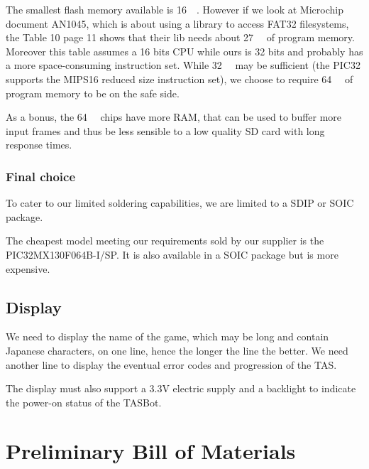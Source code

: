 \documentclass[a4paper,oneside,12pt]{article}
\begin{document}
The smallest flash memory available is \SI{16}{\kibi\byte}. However if we look
at Microchip document AN1045, which is about using a library to access FAT32
filesystems, the Table 10 page 11 shows that their lib needs about
\SI{27}{\kibi\byte} of program memory. Moreover this table assumes a 16 bits CPU
while ours is 32 bits and probably has a more space-consuming instruction
set. While \SI{32}{\kibi\byte} may be sufficient (the PIC32 supports the MIPS16
reduced size instruction set), we choose to require \SI{64}{\kibi\byte} of
program memory to be on the safe side.

As a bonus, the \SI{64}{\kibi\byte} chips have more RAM, that can be used to
buffer more input frames and thus be less sensible to a low quality SD card with
long response times.

\subsubsection{Final choice}

To cater to our limited soldering capabilities, we are limited to a SDIP or
SOIC package.

The cheapest model meeting our requirements sold by our supplier is the
PIC32MX130F064B-I/SP. It is also available in a SOIC package but is more
expensive.

\subsection{Display}
We need to display the name of the game, which may be long and contain Japanese
characters, on one line, hence the longer the line the better. We need another
line to display the eventual error codes and progression of the TAS.

The display must also support a 3.3V electric supply and a backlight to indicate
the power-on status of the TASBot.

\section{Preliminary Bill of Materials}
\end{document}
